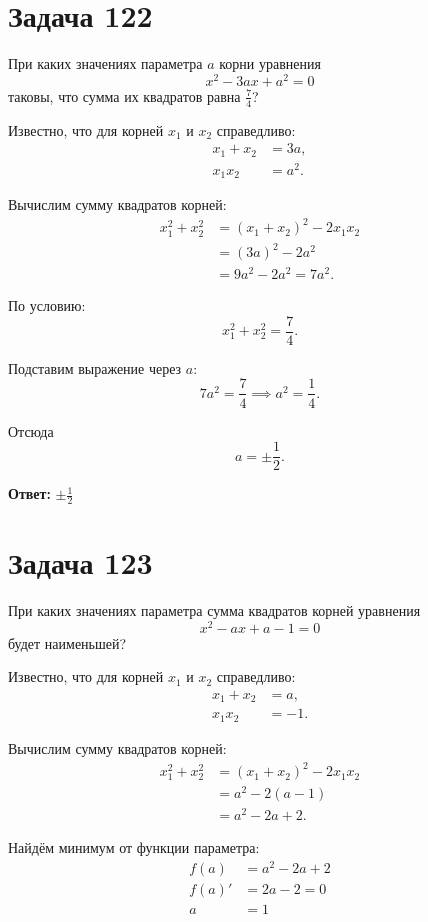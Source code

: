 \documentclass[a4paper,12pt]{article}
\begin{document}
\section{Задача 122}

При каких значениях параметра $a$ корни уравнения
\[
x^2 - 3ax + a^2 = 0
\]
таковы, что сумма их квадратов равна $\frac{7}{4}$?

Известно, что для корней $x_1$ и $x_2$ справедливо:
\begin{align*}
    x_1 + x_2 &= 3a, \\
    x_1 x_2 &= a^2.
\end{align*}

Вычислим сумму квадратов корней:
\begin{align*}
    x_1^2 + x_2^2 &= (x_1 + x_2)^2 - 2 x_1 x_2 \\
    &= (3a)^2 - 2a^2 \\
    &= 9a^2 - 2a^2 = 7a^2.
\end{align*}

По условию:
\[
x_1^2 + x_2^2 = \frac{7}{4}.
\]

Подставим выражение через \(a\):
\[
7a^2 = \frac{7}{4} \implies a^2 = \frac{1}{4}.
\]

Отсюда
\[
a = \pm \frac{1}{2}.
\]

\bigskip

\textbf{Ответ:} \(\boxed{\pm \frac{1}{2}}\)

\section{Задача 123}

При каких значениях параметра сумма квадратов корней
уравнения
\[
x^2 - ax + a - 1 = 0
\]
будет наименьшей?

Известно, что для корней $x_1$ и $x_2$ справедливо:
\begin{align*}
    x_1 + x_2 &= a, \\
    x_1 x_2 &= -1.
\end{align*}

Вычислим сумму квадратов корней:
\begin{align*}
    x_1^2 + x_2^2 &= (x_1 + x_2)^2 - 2 x_1 x_2 \\
    &= a^2 - 2(a - 1) \\
    &= a^2 - 2a + 2.
\end{align*}

Найдём минимум от функции параметра:
\begin{align*}
    f(a) &= a^2 - 2a + 2 \\
    f(a)' &= 2a - 2 = 0\\
    a &= 1
\end{align*}
\end{document}
